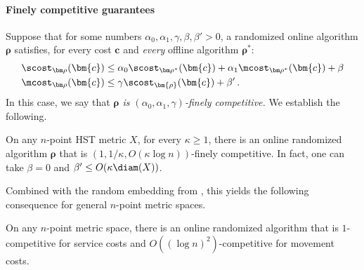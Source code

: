 \paragraph{Finely competitive guarantees}
Suppose that for some numbers $\alpha_0,\alpha_1,\gamma,\beta,\beta' > 0$,
a randomized online algorithm $\bm\rho$ satisfies, for every cost $\bm{c}$ and
\emph{every} offline algorithm $\bm{\rho}^*$:
\begin{align}
\scost_{\bm\rho}(\bm{c}) &\leq \alpha_0 \scost_{\bm\rho^*}(\bm{c}) + \alpha_1 \mcost_{\bm\rho^*}(\bm{c}) + \beta \label{eq:finesc}\\
\mcost_{\bm\rho}(\bm{c}) &\leq \gamma \scost_{\bm{\rho}}(\bm{c}) + \beta'\,.\label{eq:finemc}
\end{align}
In this case, we say that \emph{$\bm{\rho}$ is $(\alpha_0,\alpha_1,\gamma)$-finely competitive.}
We establish the following.

\begin{theorem}\label{thm:super}
	On any $n$-point HST metric $X$, for every $\kappa \geq 1$, there is an online randomized algorithm $\bm{\rho}$ that is
	$\left(1,1/\kappa,O(\kappa \log n)\right)$-finely competitive.
	In fact, one can take $\beta=0$ and $\beta' \leq O(\kappa \diam(X))$.
\end{theorem}

Combined with the random embedding from \cite{FRT04}, this yields the following consequence
for general $n$-point metric spaces.

\begin{corollary}
	On any $n$-point metric space, there is an online randomized algorithm that is
	$1$-competitive for service costs and $O((\log n)^2)$-competitive for movement costs.
\end{corollary}

